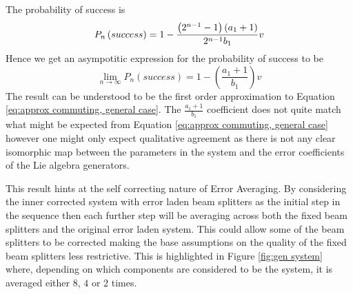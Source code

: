 \documentclass[aps,pra,twocolumn,superscriptaddress,numerical,floatfix]{revtex4-1}
\begin{document}
The probability of success is 
\begin{equation}
P_{n}\left(success\right) =  1-\frac{\left(2^{n-1}-1\right)\left(a_{1}+1\right)}{2^{n-1}b_{1}}v\nonumber \\
\end{equation}
Hence we get an asympotitic expression for the probability of success to be 
\begin{equation}
\lim_{n\rightarrow\infty}P_{n}\left(success\right)=1-\left(\frac{a_{1}+1}{b_{1}}\right)v\label{eq:PsuccessGeneral}
\end{equation}
The result can be understood to be the first order approximation to Equation \ref{eq:approx commuting, general case}. The $\frac{a_1+1}{b_1}$ coefficient does not quite match what might be expected from Equation \ref{eq:approx commuting, general case} however one might only expect qualitative agreement as there is not any clear isomorphic map between the parameters in the system and the error coefficients of the Lie algebra generators.

This result hints at the self correcting nature of Error Averaging. By considering the inner corrected system with error laden beam splitters as the initial step in the sequence then each further step will be averaging across both the fixed beam splitters and the original error laden system. This could allow some of the beam splitters to be corrected  making the base assumptions on the quality of the fixed beam splitters less restrictive. This is highlighted in Figure \ref{fig:gen system} where, depending on which components are considered to be the system, it is averaged either $8$, $4$ or $2$ times. 
\end{document}
